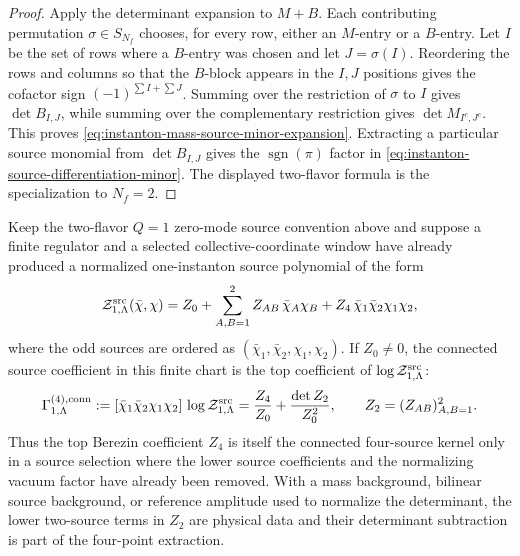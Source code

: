 \begin{proof}
Apply the determinant expansion to \(M+B\).  Each contributing permutation
\(\sigma\in S_{N_f}\) chooses, for every row, either an \(M\)-entry or a
\(B\)-entry.  Let \(I\) be the set of rows where a \(B\)-entry was chosen and
let \(J=\sigma(I)\).  Reordering the rows and columns so that the \(B\)-block
appears in the \(I,J\) positions gives the cofactor sign
\((-1)^{\sum I+\sum J}\).  Summing over the restriction of \(\sigma\) to
\(I\) gives \(\det B_{I,J}\), while summing over the complementary
restriction gives \(\det M_{I^c,J^c}\).  This proves
\eqref{eq:instanton-mass-source-minor-expansion}.  Extracting a particular
source monomial from \(\det B_{I,J}\) gives the \(\operatorname{sgn}(\pi)\)
factor in \eqref{eq:instanton-source-differentiation-minor}.  The displayed
two-flavor formula is the specialization to \(N_f=2\).
\end{proof}

\begin{proposition}
\label{prop:instanton-connected-four-source-extraction}
Keep the two-flavor \(Q=1\) zero-mode source convention above and suppose a
finite regulator and a selected collective-coordinate window have already
produced a normalized one-instanton source polynomial of the form
\begin{equation}
  \mathcal Z_{1,\Lambda}^{\rm src}(\bar\chi,\chi)
  =
  Z_0
  +
  \sum_{A,B=1}^{2}Z_{AB}\,\bar\chi_A\chi_B
  +
  Z_4\,\bar\chi_1\bar\chi_2\chi_1\chi_2 ,
  \label{eq:instanton-four-source-finite-polynomial}
\end{equation}
where the odd sources are ordered as
\((\bar\chi_1,\bar\chi_2,\chi_1,\chi_2)\).  If \(Z_0\ne0\), the connected
source coefficient in this finite chart is the top coefficient of
\(\log\mathcal Z_{1,\Lambda}^{\rm src}\):
\begin{equation}
  \Gamma^{(4),{\rm conn}}_{1,\Lambda}
  :=
  [\bar\chi_1\bar\chi_2\chi_1\chi_2]\,
  \log\mathcal Z_{1,\Lambda}^{\rm src}
  =
  \frac{Z_4}{Z_0}
  +
  \frac{\det Z_2}{Z_0^2},
  \qquad
  Z_2=(Z_{AB})_{A,B=1}^{2}.
  \label{eq:instanton-connected-four-source-coefficient}
\end{equation}
Thus the top Berezin coefficient \(Z_4\) is itself the connected four-source
kernel only in a source selection where the lower source coefficients and the
normalizing vacuum factor have already been removed.  With a mass background,
bilinear source background, or reference amplitude used to normalize the
determinant, the lower two-source terms in \(Z_2\) are physical data and their
determinant subtraction is part of the four-point extraction.
\end{proposition}

